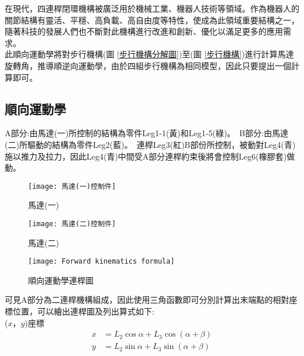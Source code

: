 在現代，四連桿閉環機構被廣泛用於機械工業、機器人技術等領域。作為機器人的關節結構有靈活、平穩、高負載、高自由度等特性，使成為此領域重要結構之一，隨著科技的發展人們也不斷對此機構進行改進和創新、優化以滿足更多的應用需求。\\

此順向運動學將對步行機構(圖 \ref{步行機構分解圖})至(圖 \ref{步行機構})進行計算馬達旋轉角，推導順逆向運動學，由於四組步行機構為相同模型，因此只要提出一個計算即可。
\newpage

\subsection{順向運動學}
A部分:由馬達(一)所控制的結構為零件Leg1-1(黃)和Leg1-5(綠)。\
B部分:由馬達(二)所驅動的結構為零件Leg2(藍)。\
連桿Leg3(紅)B部份所控制，被動對Leg4(青)施以推力及拉力，因此Leg4(青)中間受A部分連桿約束後將會控制Leg6(橡膠套)做動。\\
\begin{figure}[htbp]
  \begin{minipage}[t]{0.5\linewidth}
    \centering
    \texttt{[image: 馬達(一)控制件]}
    \caption{馬達(一)}
    \label{馬達(一)控制件}
  \end{minipage}
  \hfill
  \begin{minipage}[t]{0.4\linewidth}
    \centering
    \texttt{[image: 馬達(二)控制件]}
    \caption{馬達(二)}
    \label{馬達(二)控制件}
  \end{minipage}
\end{figure}
\newpage


\begin{figure}[hbt!]
\begin{center}
\texttt{[image: Forward kinematics formula]}
\caption{\Large 順向運動學連桿圖}\label{Forward kinematics formula}
\end{center}
\end{figure}

可見A部分為二連桿機構組成，因此使用三角函數即可分別計算出末端點的相對座標位置，可以繪出連桿圖及列出算式如下:\\

($x$，$y$)座標
\[
\begin{aligned}
x&=L_{2}\cos \alpha +L_{3}\cos \left( \alpha +\beta \right)\\
y&=L_{2}\sin \alpha +L_{3}\sin \left( \alpha +\beta \right)\\
\end{aligned}
\]\\

